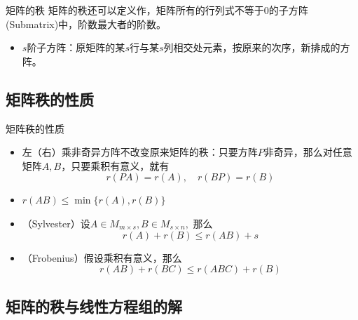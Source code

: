 
\begin{frame}

\begin{block}{矩阵的秩}
矩阵的秩还可以定义作，矩阵所有的行列式不等于$0$的子方阵(Submatrix)中，阶数最大者的阶数。

\vspace{2em}
\pause

\begin{itemize}
\item $s$阶子方阵：原矩阵的某$s$行与某$s$列相交处元素，按原来的次序，新排成的方阵。
\end{itemize}
\end{block}

\end{frame}


\subsection{矩阵秩的性质}


\begin{frame}

\begin{block}{矩阵秩的性质}
\begin{itemize}
\item 左（右）乘非奇异方阵不改变原来矩阵的秩：只要方阵$P$非奇异，那么对任意矩阵$A,B$，只要乘积有意义，就有
\[r(PA) = r(A), \quad r(BP) = r(B)\]
\item $r(AB) \leqslant \min\{ r(A), r(B) \}$
\pause
\item （Sylvester）设$A \in M_{m\times s}, B \in M_{s\times n},$ 那么
\[r(A) + r(B) \leqslant r(AB) + s\]
\item （Frobenius）假设乘积有意义，那么
\[r(AB) + r(BC) \leqslant r(ABC) + r(B)\]
\end{itemize}
\end{block}

\end{frame}


\subsection{矩阵的秩与线性方程组的解}

